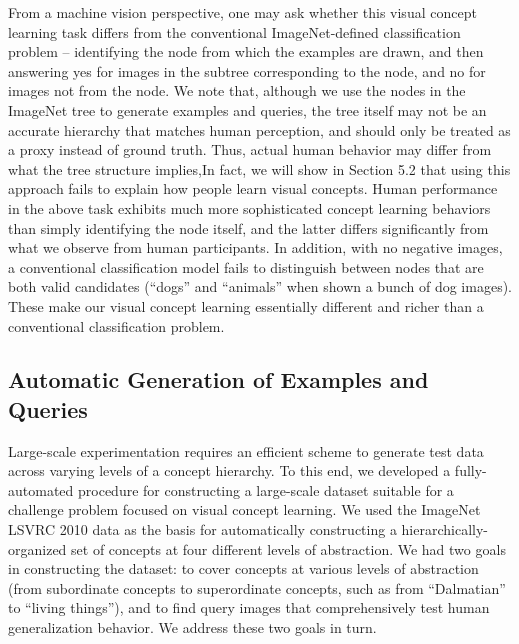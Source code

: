 From a machine vision perspective, one may ask whether this visual concept learning task differs from the conventional ImageNet-defined classification problem -- identifying the node from which the examples are drawn, and then answering yes for images in the subtree corresponding to the node, and no for images not from the node. We note that, although we use the nodes in the ImageNet tree to generate examples and queries, the tree itself may not be an accurate hierarchy that matches human perception, and should only be treated as a proxy instead of ground truth. Thus, actual human behavior may differ from what the tree structure implies,In fact, we will show in Section 5.2 that using this approach fails to explain how people learn visual concepts. Human performance in the above task exhibits much more sophisticated concept learning behaviors than simply identifying the node itself, and the latter differs significantly from what we observe from human participants. In addition, with no negative images, a conventional classification model fails to distinguish between nodes that are both valid candidates (\eg ``dogs'' and ``animals'' when shown a bunch of dog images). These make our visual concept learning essentially different and richer than a conventional classification problem.

\subsection{Automatic Generation of Examples and Queries}

Large-scale experimentation requires an efficient scheme to generate test data across varying levels of a concept hierarchy. To this end, we developed a fully-automated procedure for constructing a large-scale dataset suitable for a challenge problem focused on visual concept learning. We used the ImageNet LSVRC \cite{ilsvrc} 2010 data as the basis for automatically constructing a hierarchically-organized set of concepts at four different levels of abstraction. We had two goals in constructing the dataset: to cover concepts at various levels of abstraction (from subordinate concepts to superordinate concepts, such as from “Dalmatian” to “living things”), and to find query images that comprehensively test human generalization behavior. We address these two goals in turn.

